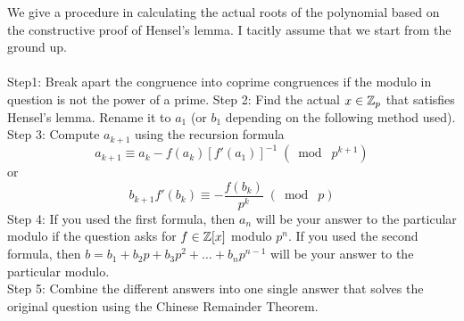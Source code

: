 \documentclass[a4paper]{article}
\begin{document}
We give a procedure in calculating the actual roots of the polynomial based on the constructive proof of Hensel's lemma. I tacitly assume that we start from the ground up. \\~\\
Step1: Break apart the congruence into coprime congruences if the modulo in question is not the power of a prime. 
Step 2: Find the actual $x\in\mathbb{Z}_p$ that satisfies Hensel's lemma. Rename it to $a_1$ (or $b_1$ depending on the following method used). \\
Step 3: Compute $a_{k+1}$ using the recursion formula $$a_{k+1}\equiv a_k-f(a_k)[f'(a_1)]^{-1}\;(\bmod\;p^{k+1})$$ or $$b_{k+1}f'(b_k)\equiv-\frac{f(b_k)}{p^k}\;(\bmod\;p)$$
Step 4: If you used the first formula, then $a_n$ will be your answer to the particular modulo if the question asks for $f\in\mathbb{Z}[x]$ modulo $p^n$. If you used the second formula, then $b=b_1+b_2p+b_3p^2+\dots+b_np^{n-1}$ will be your answer to the particular modulo. \\
Step 5: Combine the different answers into one single answer that solves the original question using the Chinese Remainder Theorem. 
\end{document}

